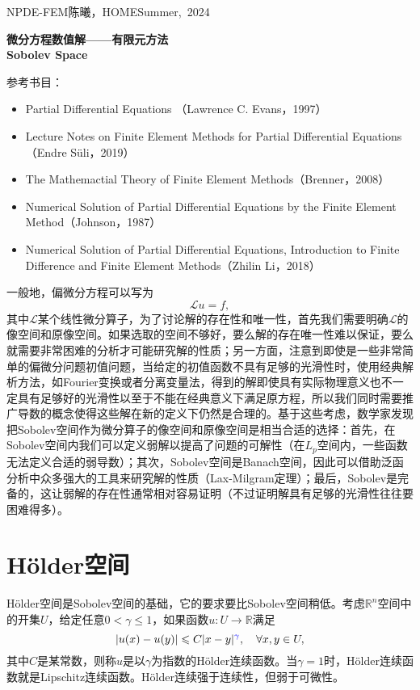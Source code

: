 \documentclass[a4paper,10pt]{ctexart}
\begin{document}
\hfill\vbox{\hbox{NPDE-FEM}\hbox{陈曦，HOME}\hbox{Summer, 2024}}

\begin{center}\Large
    \textbf{微分方程数值解——有限元方法}\\{\normalsize\bf {Sobolev Space}}
\end{center}
\vskip 30pt
\small {参考书目：
\begin{itemize}
    \item Partial Differential Equations （Lawrence C. Evans，1997）
    \item Lecture Notes on Finite Element Methods for Partial Differential Equations（Endre Süli，2019）
    \item The Mathemactial Theory of Finite Element Methods（Brenner，2008）
    \item Numerical Solution of Partial Differential Equations by the Finite Element Method（Johnson，1987）
    \item Numerical Solution of Partial Differential Equations, Introduction to Finite Difference and Finite Element Methods（Zhilin Li，2018）
\end{itemize}}

一般地，偏微分方程可以写为
\[
    \mathcal{L}u = f,
\]
其中$ \mathcal{L} $某个线性微分算子，为了讨论解的存在性和唯一性，首先我们需要明确$ \mathcal{L} $的像空间和原像空间。如果选取的空间不够好，要么解的存在唯一性难以保证，要么就需要非常困难的分析才可能研究解的性质；另一方面，注意到即使是一些非常简单的偏微分问题初值问题，当给定的初值函数不具有足够的光滑性时，使用经典解析方法，如Fourier变换或者分离变量法，得到的解即使具有实际物理意义也不一定具有足够好的光滑性以至于不能在经典意义下满足原方程，所以我们同时需要推广导数的概念使得这些解在新的定义下仍然是合理的。基于这些考虑，数学家发现把Sobolev空间作为微分算子的像空间和原像空间是相当合适的选择：首先，在Sobolev空间内我们可以定义弱解以提高了问题的可解性（在$ L_p $空间内，一些函数无法定义合适的弱导数）；其次，Sobolev空间是Banach空间，因此可以借助泛函分析中众多强大的工具来研究解的性质（Lax-Milgram定理）；最后，Sobolev是完备的，这让弱解的存在性通常相对容易证明（不过证明解具有足够的光滑性往往要困难得多）。

\section{Hölder空间}
Hölder空间是Sobolev空间的基础，它的要求要比Sobolev空间稍低。考虑$ \mathbb{R}^n $空间中的开集$ U $，给定任意$ 0<\gamma\leqslant 1 $，如果函数$ u:U\to\mathbb{R} $满足
\begin{equation}
    |u(x) - u(y)| \leqslant C|x-y|^{\textcolor{blue}{\gamma}},\quad \forall x,y\in U,
\end{equation}
其中$ C $是某常数，则称$ u $是以$ \gamma $为指数的Hölder连续函数。当$ \gamma = 1 $时，Hölder连续函数就是Lipschitz连续函数。Hölder连续强于连续性，但弱于可微性。
\end{document}
